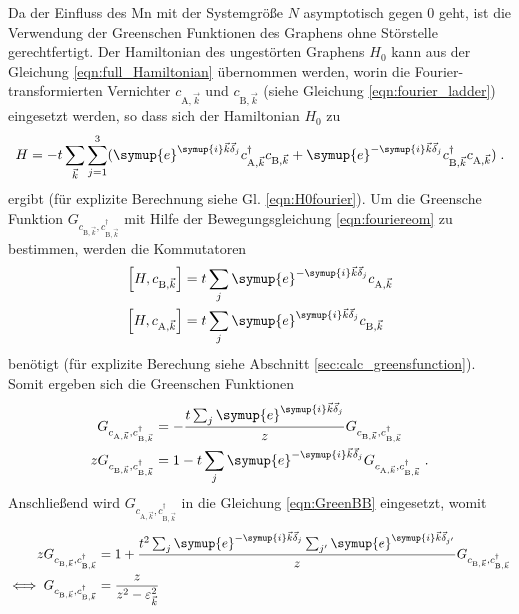 Da der Einfluss des Mn mit der Systemgröße $N$ asymptotisch gegen 0 geht, ist die Verwendung der 
Greenschen Funktionen des Graphens ohne Störstelle gerechtfertigt.
Der Hamiltonian des ungestörten Graphens $H_0$ kann aus der Gleichung \eqref{eqn:full_Hamiltonian} übernommen werden,
worin die Fourier-transformierten Vernichter $c_{\text{A},\vec{k}}$ und $c_{\text{B},\vec{k}}$ (siehe Gleichung \eqref{eqn:fourier_ladder}) eingesetzt werden,
so dass sich der Hamiltonian $H_0$ zu  
\begin{equation}
    H = -t \sum_{\vec{k}}\sum_{j=1}^3( \symup{e}^{\symup{i}\vec{k}\vec{\delta}_j}c^\dagger_{\text{A},\vec{k}} c_{\text{B},\vec{k}} + \symup{e}^{-\symup{i}\vec{k}\vec{\delta}_j}c^\dagger_{\text{B},\vec{k}} c_{\text{A},\vec{k}} ) \; .
\end{equation} 
ergibt (für explizite Berechnung siehe Gl. \eqref{eqn:H0fourier}).
Um die Greensche Funktion $G_{c_{\text{B}, \vec{k}}, c_{\text{B}, \vec{k}}^\dagger}$ mit Hilfe der Bewegungsgleichung \eqref{eqn:fouriereom} zu bestimmen, werden die Kommutatoren
\begin{align}
    \left [H,  c_{\text{B},\vec{k}} \right ] &= t \sum_j \symup{e}^{-\symup{i}\vec{k}\vec{\delta}_j} c_{\text{A},\vec{k}} \label{eqn:test} \\
    \left [H,  c_{\text{A},\vec{k}} \right ] &= t \sum_j \symup{e}^{\symup{i}\vec{k}\vec{\delta}_j} c_{\text{B},\vec{k}}
\end{align}
benötigt (für explizite Berechung siehe Abschnitt \ref{sec:calc_greensfunction}).
Somit ergeben sich die Greenschen Funktionen
\begin{align}
    G_{c_{\text{A},\vec{k}}, c^\dagger_{\text{B},\vec{k}}} &=  -\frac{t\sum_j \symup{e}^{\symup{i}\vec{k}\vec{\delta}_j}}{z} G_{c_{\text{B},\vec{k}}, c^\dagger_{\text{B},\vec{k}}}\\
    zG_{c_{\text{B},\vec{k}}, c^\dagger_{\text{B},\vec{k}}} &= 1 -  t\sum_j \symup{e}^{-\symup{i}\vec{k}\vec{\delta}_j} G_{c_{\text{A},\vec{k}}, c^\dagger_{\text{B},\vec{k}}} \; . \label{eqn:GreenBB}
\end{align}
Anschließend wird $G_{c_{\text{A},\vec{k}}, c^\dagger_{\text{B},\vec{k}}}$ in die Gleichung \eqref{eqn:GreenBB} eingesetzt, womit
\begin{align}
    zG_{c_{\text{B},\vec{k}}, c^\dagger_{\text{B},\vec{k}}} &= 1 + \frac{t^2\sum_j \symup{e}^{-\symup{i}\vec{k}\vec{\delta}_j} \sum_{j'} \symup{e}^{\symup{i}\vec{k}\vec{\delta}_{j'}} }{z} G_{c_{\text{B},\vec{k}}, c^\dagger_{\text{B},\vec{k}}} \\
    \iff G_{c_{\text{B},\vec{k}}, c^\dagger_{\text{B},\vec{k}}} &= \frac{z}{z^2 - \varepsilon^2_{\vec{k}}  } \; 
\end{align}
